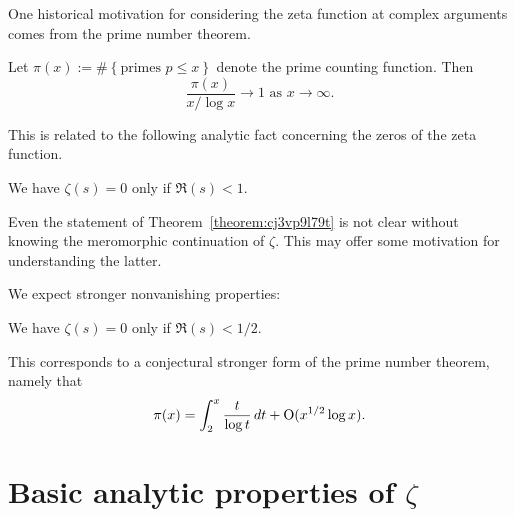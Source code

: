 \documentclass[reqno]{amsart}  \numberwithin{theorem}{section} \numberwithin{equation}{section}
\begin{document}
One historical motivation for considering the zeta function at complex arguments comes from the prime number theorem.
\begin{theorem}
  Let $\pi(x) := \# \left\{ \text{primes } p \leq x \right\}$ denote the prime counting function.  Then
  \begin{equation*}
    \frac{\pi(x)}{x / \log x} \rightarrow 1
    \text{ as } x \rightarrow \infty.
  \end{equation*}
\end{theorem}
This is related to the following analytic fact concerning the zeros of the zeta function.
\begin{theorem}\label{theorem:cj3vp9l79t}
  We have $\zeta(s) = 0$ only if $\Re(s) < 1$.
\end{theorem}
\begin{remark}
  Even the statement of Theorem~\ref{theorem:cj3vp9l79t} is not clear without knowing the meromorphic continuation of $\zeta$.  This may offer some motivation for understanding the latter.
\end{remark}
We expect stronger nonvanishing properties:
\begin{conjecture}
  We have $\zeta(s) = 0$ only if $\Re(s) < 1/2$.
\end{conjecture}
This corresponds to a conjectural stronger form of the prime number theorem, namely that
\begin{equation*}
  \pi(x) = \int_2^x \frac{t}{\log t} \, d t
  + \operatorname{O} (x^{1/2} \log x).
\end{equation*}

\newpage

\newpage
\section{Basic analytic properties of $\zeta$}\label{sec:cj4unjziaz}
\end{document}
